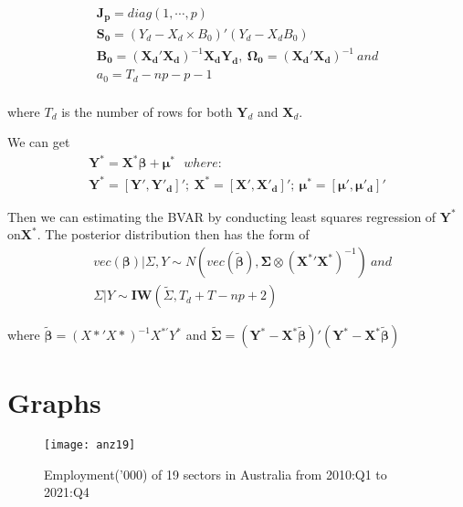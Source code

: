 \documentclass{monashthesis}
\begin{document}
\[
\begin{aligned}
\boldsymbol{J_p}=diag(1,\cdots,p)\\
\boldsymbol{S_0}=(Y_d-X_d\times B_0)'(Y_d-X_dB_0)\\
\boldsymbol{B_0}=(\boldsymbol{X_d}'\boldsymbol{X_d})^{-1}\boldsymbol{X_d}\boldsymbol{Y_d},\ \boldsymbol{\Omega_0}=(\boldsymbol{X_d}'\boldsymbol{X_d})^{-1}\  and\\
a_0=T_d-np-p-1\\
\end{aligned}
\]

where \(T_d\) is the number of rows for both \(\boldsymbol{Y}_d\) and \(\boldsymbol{X}_d\).

We can get
\[
\begin{aligned}
\boldsymbol{Y^*}=\boldsymbol{X^*}\boldsymbol{\beta}+\boldsymbol{\mu}^*\ \ \  where: \\
\boldsymbol{Y^*}=[\boldsymbol{Y'},\boldsymbol{Y'_d}]';\ \boldsymbol{X^*}=[\boldsymbol{X'},\boldsymbol{X'_d}]';\ \boldsymbol{\mu^*}=[\boldsymbol{\mu'},\boldsymbol{\mu'_d}]'
\end{aligned}
\]

Then we can estimating the BVAR by conducting least squares regression of \(\boldsymbol{Y}^*\) on\(\boldsymbol{X}^*\). The posterior distribution then has the form of
\[
\begin{aligned}
&vec(\mathbf{\beta})|\Sigma,Y\sim N(vec(\boldsymbol{\tilde\beta}),\boldsymbol{\Sigma}\otimes(\boldsymbol{X^*}'\boldsymbol{X^*})^{-1})\ and\\
&\Sigma|Y\sim\mathbf{IW}(\tilde\Sigma,T_d+T-np+2)
\end{aligned}
\]

where \(\boldsymbol{\tilde\beta} =(X*'X*)^{-1}X^{*'}Y^*\) and \(\tilde{\boldsymbol{\Sigma}}=(\boldsymbol{Y^*}-\boldsymbol{X^*}\boldsymbol{\tilde\beta})'(\boldsymbol{Y^*}-\boldsymbol{X^*}\boldsymbol{\tilde\beta})\)

\newpage

\hypertarget{graphs}{%
\chapter{Graphs}\label{graphs}}

\graphicspath{ {/Users/elvisyang/Desktop/hon_proj/Disaggregated_Employment/Honours_thesis/figures} }

\begin{figure}[t]
\texttt{[image: anz19]}
\centering
\caption{Employment('000) of 19 sectors in Australia from 2010:Q1 to 2021:Q4}
\label{fig:19}
\end{figure}
\end{document}
